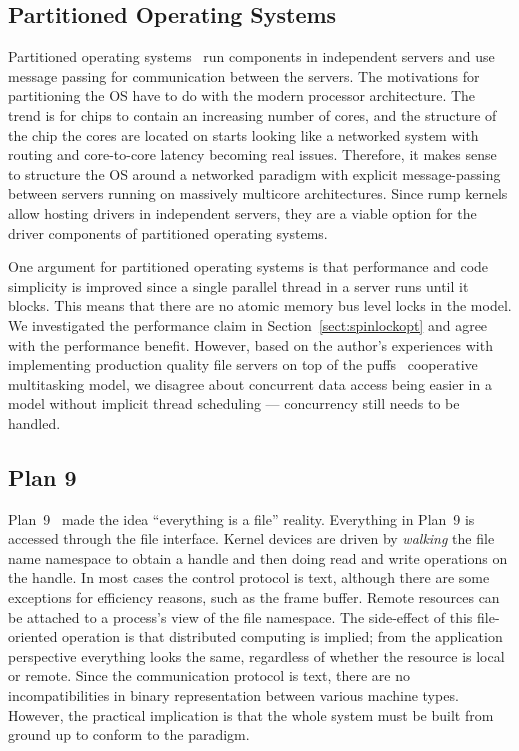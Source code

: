 \subsection{Partitioned Operating Systems}

Partitioned operating systems~\cite{baumann:multikernel,wentzlaff:casefos}
run components in independent servers and use message passing for
communication between the servers.  The motivations for partitioning
the OS have to do with the modern processor architecture.  The trend
is for chips to contain an increasing number of cores, and the structure of the
chip the cores are located on starts looking like a networked system
with routing and core-to-core latency becoming real issues.  Therefore,
it makes sense to structure the OS around a networked paradigm with
explicit message-passing between servers running on massively multicore
architectures.  Since rump kernels allow hosting drivers in independent
servers, they are a viable option for the driver components of partitioned
operating systems.

One argument for partitioned operating systems is that performance
and code simplicity is improved since a single parallel thread in
a server runs until it blocks.  This means that there are no atomic
memory bus level locks in the model.  We investigated the performance
claim in Section~\ref{sect:spinlockopt} and agree with the performance
benefit.  However, based on the author's experiences with implementing
production quality file servers on top of the puffs~\cite{kantee:puffs}
cooperative multitasking model, we disagree about concurrent data
access being easier in a model without implicit thread scheduling ---
concurrency still needs to be handled.

\subsection{Plan 9}

Plan~9~\cite{pike:plan9} made the idea ``everything is a file''
reality.  Everything in Plan~9 is accessed through the file interface.
Kernel devices are driven by \textit{walking} the file name namespace
to obtain a handle and then doing read and write operations on the
handle.  In most cases the control protocol is text, although there
are some exceptions for efficiency reasons, such as the frame
buffer.  Remote resources can be attached to a process's view of
the file namespace.  The side-effect of this file-oriented operation is that distributed
computing is implied; from the application perspective
everything looks the same, regardless of whether the resource is local
or remote.  Since the communication protocol is text, there are no incompatibilities
in binary representation between various machine types.  However,
the practical implication is that the whole system must be built
from ground up to conform to the paradigm.

